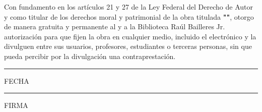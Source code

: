 

\begin{center}

\vspace*{\baselineskip} %


Con fundamento en los artículos 21 y 27 de la Ley
Federal del Derecho de Autor y como titular de los derechos moral y 
patrimonial de la obra titulada 
\textbf{"\maintitle"}, 
otorgo de manera gratuita y 
permanente al {\myuniversity}  y a la 
Biblioteca Raúl Bailleres Jr. autorización para que fijen 
la obra en cualquier medio, incluido el electrónico y 
la divulguen entre sus usuarios, profesores, estudiantes o terceras
personas, sin que pueda percibir por la divulgación 
una contraprestación.


\vspace{1cm}

\MakeUppercase{\myname}


\vspace{.7cm}

\noindent\rule{4cm}{0.4pt}

FECHA


\vspace{.7cm}

\noindent\rule{4cm}{0.4pt}

FIRMA


\end{center}


